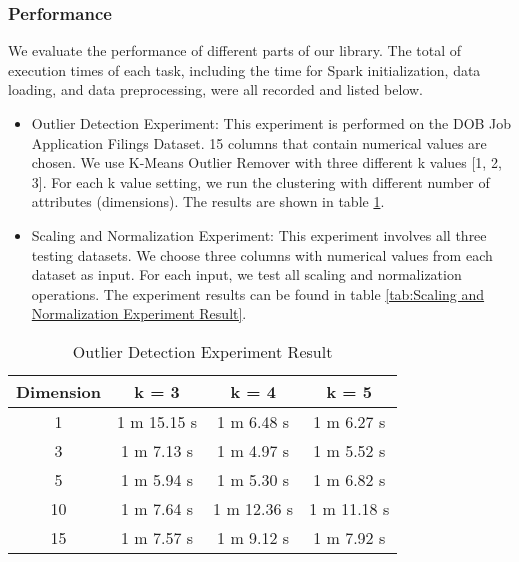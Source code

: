 \documentclass[sigconf]{acmart}
\begin{document}
\subsubsection{Performance} We evaluate the performance of different parts of our library. The total of execution times of each task, including the time for Spark initialization, data loading, and data preprocessing, were all recorded and listed below.
\begin{itemize}
	\item{Outlier Detection Experiment}: This experiment is performed on the DOB Job Application Filings Dataset. 15 columns that contain numerical values are chosen. We use K-Means Outlier Remover with three different k values [1, 2, 3]. For each k value setting, we run the clustering with different number of attributes (dimensions). The results are shown in table \ref{tab:Outlier Detection Experiment Result}.
	\item{Scaling and Normalization Experiment}: This experiment involves all three testing datasets. We choose three columns with numerical values from each dataset as input. For each input, we test all scaling and normalization operations. The experiment results can be found in table \ref{tab:Scaling and Normalization Experiment Result}.
\end{itemize}

\begin{table}
\caption{Outlier Detection Experiment Result}   
\label{tab:Outlier Detection Experiment Result}
\begin{tabular}{cccc}   
Dimension  &  k = 3  &  k = 4  & k = 5  \\  
\hline
1   & 1 m 15.15 s  & 1 m 6.48 s   & 1 m 6.27 s             \\ 
3   & 1 m 7.13 s    & 1 m 4.97 s   & 1 m 5.52 s             \\  
5   & 1 m 5.94 s    & 1 m 5.30 s   & 1 m 6.82 s             \\ 
10 & 1 m 7.64 s    & 1 m 12.36 s & 1 m 11.18 s           \\ 
15 & 1 m 7.57 s    & 1 m 9.12 s   & 1 m 7.92 s             \\ 

\end{tabular}   
\end{table}
\end{document}
